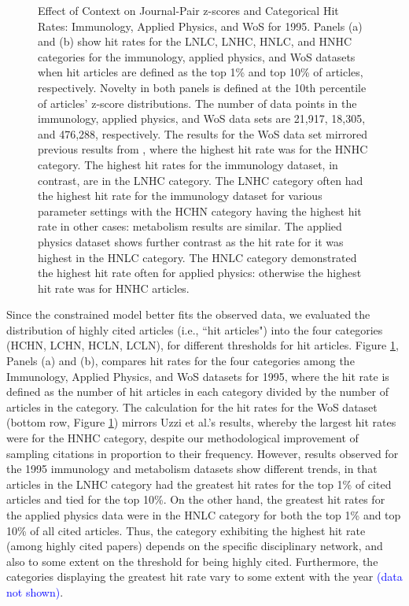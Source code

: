 \documentclass[NETN]{stjour}
\begin{document}
\begin{figure}
\caption{Effect of Context on Journal-Pair z-scores and Categorical Hit Rates: Immunology, Applied Physics, and WoS for 1995. Panels (a) and (b) show hit rates for the LNLC, LNHC, HNLC, and HNHC categories for the immunology, applied physics, and WoS datasets when hit articles are defined as the top 1\% and top 10\% of articles, respectively.  Novelty in both panels is defined at the 10th percentile of articles' z-score distributions. The number of data points in the immunology, applied physics, and WoS data sets are 21,917, 18,305, and 476,288, respectively.  The results for the WoS data set mirrored previous results from \cite{uzzi_atypical_2013}, where the highest hit rate was for the HNHC category.  The highest hit rates for the immunology dataset, in contrast, are in the LNHC category. The LNHC category often had the highest hit rate for the immunology dataset for various parameter settings with the HCHN category having the highest hit rate in other cases: metabolism results are similar. The applied physics dataset shows further contrast as the hit rate for it was highest in the HNLC category.  The HNLC category demonstrated the highest hit rate often for applied physics: otherwise the highest hit rate was for HNHC articles.}
\label{fig:Fig2}
\end{figure}

Since the constrained model better fits the observed data, we evaluated the distribution of 
highly cited articles  (i.e., ``hit articles")
 into the four categories (HCHN, LCHN, HCLN, LCLN), for different
thresholds for hit articles.
Figure \ref{fig:Fig2}, Panels (a) and (b), compares hit rates for the four categories among the Immunology, Applied Physics, and WoS datasets for 1995, where the hit rate is defined as the number of hit articles in each category divided by the number of articles in the category. 
The calculation for the hit rates for the WoS dataset (bottom row, Figure \ref{fig:Fig2})
mirrors Uzzi et al.'s results, whereby the largest hit rates were for the HNHC category, despite our methodological improvement of sampling citations in proportion to their frequency. 
However, results observed for the 1995 immunology and metabolism datasets show different
trends, in that  articles in the LNHC category had the greatest hit rates for the top 1\% of cited articles and tied for the top 10\%.
On the other hand, the greatest hit rates for the applied physics data were   in the HNLC category for both the top 1\% and top 10\% of all cited articles.  
Thus, the category exhibiting the highest hit rate (among highly cited papers) depends on the
specific disciplinary network, and also to some extent on the threshold for being highly cited.
Furthermore, the categories displaying the greatest hit rate vary to some extent %
with the year  \textcolor{blue}{(data not shown)}.
\end{document}
